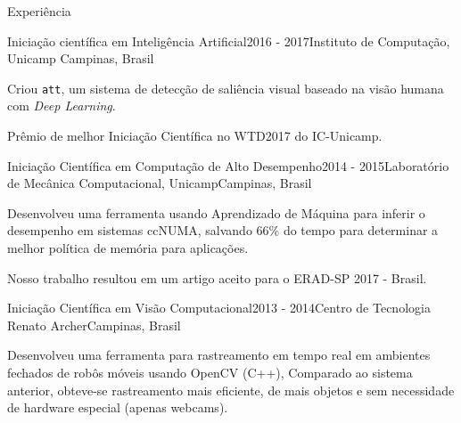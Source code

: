 \documentclass[8pt]{resume}
\newcommand{\tit}[1]{\textit{#1}}
\newcommand{\ttt}[1]{\texttt{#1}}
\begin{document}
\begin{rSection}{Experiência}
\begin{rSubsection}{Iniciação científica em Inteligência Artificial}{2016 - 2017}{Instituto de Computação, Unicamp}
    {Campinas, Brasil}
    \item Criou \ttt{att}, um sistema de detecção de saliência visual
        baseado na visão humana com \tit{Deep Learning}.
    \item Prêmio de melhor Iniciação Científica no WTD2017 do IC-Unicamp.
\end{rSubsection}

\begin{rSubsection}{Iniciação Científica em Computação de Alto Desempenho}{2014 - 2015}{Laboratório de Mecânica Computacional, Unicamp}{Campinas, Brasil}
    \item Desenvolveu uma ferramenta usando Aprendizado de Máquina para inferir o
        desempenho em sistemas ccNUMA, salvando $66\%$ do tempo para determinar
        a melhor política de memória para aplicações.
    \item Nosso trabalho resultou em um artigo aceito para o ERAD-SP 2017 - Brasil.
\end{rSubsection}

\begin{rSubsection}{Iniciação Científica em Visão Computacional}{2013 - 2014}{Centro de Tecnologia Renato Archer}{Campinas, Brasil}
    \item Desenvolveu uma ferramenta para rastreamento em tempo real em
        ambientes fechados de robôs móveis usando OpenCV (C++),
        Comparado ao sistema anterior,
        obteve-se rastreamento mais eficiente, de mais objetos e sem necessidade
        de hardware especial (apenas webcams).
\end{rSubsection}


\end{rSection}
\end{document}
